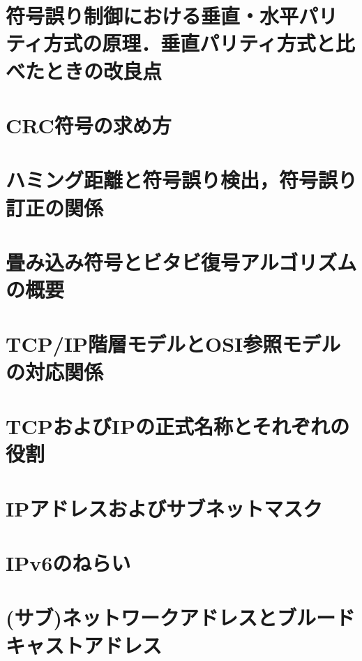 \documentclass[10.5pt]{jsarticle}
\begin{document}
\section{符号誤り制御における垂直・水平パリティ方式の原理．垂直パリティ方式と比べたときの改良点}



\section{CRC符号の求め方}



\section{ハミング距離と符号誤り検出，符号誤り訂正の関係}



\section{畳み込み符号とビタビ復号アルゴリズムの概要}



\section{TCP/IP階層モデルとOSI参照モデルの対応関係}



\section{TCPおよびIPの正式名称とそれぞれの役割}



\section{IPアドレスおよびサブネットマスク}



\section{IPv6のねらい}



\section{(サブ)ネットワークアドレスとブルードキャストアドレス}
\end{document}
